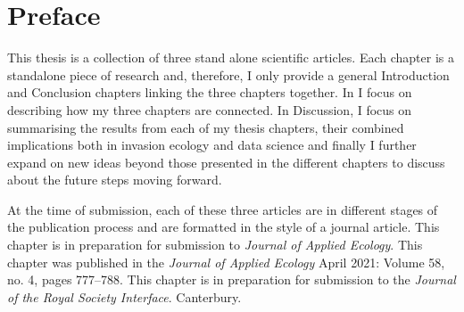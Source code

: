 

\chapter*{Preface} %
This thesis is a collection of three stand alone scientific articles. Each chapter is a standalone piece of research and, therefore, I only provide a general Introduction and Conclusion chapters linking the three chapters together. In  I focus on describing how my three chapters are connected. In  Discussion, I focus on summarising the results from each of my thesis chapters, their combined implications both in invasion ecology and data science and finally I further expand on new ideas beyond those presented in the different chapters to discuss about the future steps moving forward.

At the time of submission, each of these three articles are in different stages of the publication process and are formatted in the style of a journal article. 
This chapter  is in preparation for  submission to \textit{Journal of Applied Ecology}. 
This chapter  was published in 
the \textit{Journal of Applied Ecology} April 2021: Volume 58, no. 4, pages 777--788. 
This chapter is in preparation for submission to the \textit{Journal of the Royal Society Interface}. 
 Canterbury.


